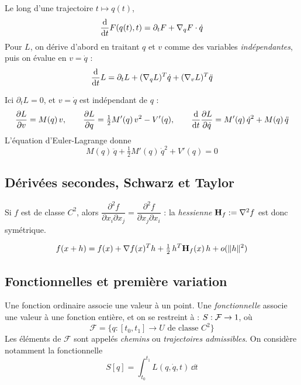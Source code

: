 Le long d'une trajectoire $t\mapsto q(t)$,
\[
    \frac{\mathrm{d}}{\mathrm{d} t} F(q(t),t) = \partial_t F + \nabla_q F\cdot\dot q
\]
Pour $L$, on dérive d'abord en traitant $q$ et $v$ comme des
variables \emph{indépendantes}, puis on évalue en $v = \dot q$ :
\[
    \frac{\mathrm{d}}{\mathrm{d} t} L = \partial_t L + (\nabla_q L)^T\dot q
    + (\nabla_v L)^T\ddot q
\]

\begin{exemple}[$L = \tfrac12 M(q)v^2 - V(q)$]
    Ici $\partial_t L = 0$, et $v = \dot q$ est indépendant de $q$ :
    \[
        \frac{\partial L}{\partial v} = M(q)\,v,
        \qquad
        \frac{\partial L}{\partial q} = \tfrac12 M'(q)\,v^2 - V'(q),
        \qquad
        \frac{\mathrm{d}}{\mathrm{d} t}\frac{\partial L}{\partial \dot q} = M'(q)\,\dot q^2 + M(q)\,\ddot q
    \]
    L'équation d'Euler-Lagrange donne
    \[
        M(q)\,\ddot q + \tfrac12 M'(q)\,\dot q^2 + V'(q) = 0
    \]
\end{exemple}


\subsection{Dérivées secondes, Schwarz et Taylor}

\begin{theoreme}[Schwarz]
    Si $f$ est de classe $C^2$, alors
    $\dfrac{\partial^2 f}{\partial x_i\partial x_j}
    = \dfrac{\partial^2 f}{\partial x_j\partial x_i}$ :
    la \emph{hessienne} $\mathbf{H}_f := \nabla^2 f$ est donc symétrique.
\end{theoreme}

\begin{theoreme}
    \[
        f(x+h) = f(x) + \nabla f(x)^T h
        + \tfrac12\, h^T\mathbf{H}_f(x)\,h + o(\|h\|^2)
    \]
\end{theoreme}

\subsection{Fonctionnelles et première variation}

\begin{definition}[Fonctionnelle]
    Une fonction ordinaire associe une valeur à un point. 
    Une \emph{fonctionnelle} associe une valeur à une fonction
    entière, et on se restreint à : $S : \mathcal{F}\to1$, où
    \[
        \mathcal{F} = \{q : [t_0,t_1]\to U
        \text{ de classe } C^2\}
    \]
    Les éléments de $\mathcal{F}$ sont appelés \emph{chemins} ou
    \emph{trajectoires admissibles}. On considère notamment la
    fonctionnelle
    \[
        S[q] = \int_{t_0}^{t_1} L(q,\dot q,t)\,\dd t
    \]
\end{definition}

